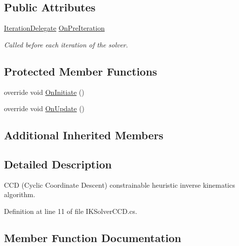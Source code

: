 \subsection*{Public Attributes}
\begin{DoxyCompactItemize}
\item 
\mbox{\hyperlink{class_root_motion_1_1_final_i_k_1_1_i_k_solver_ae3da6a8ccd8224ce56d15c4da5cd1ef7}{Iteration\+Delegate}} \mbox{\hyperlink{class_root_motion_1_1_final_i_k_1_1_i_k_solver_c_c_d_a8dd20d15fc2179df1e1cfb3d476804df}{On\+Pre\+Iteration}}
\begin{DoxyCompactList}\small\item\em Called before each iteration of the solver. \end{DoxyCompactList}\end{DoxyCompactItemize}
\subsection*{Protected Member Functions}
\begin{DoxyCompactItemize}
\item 
override void \mbox{\hyperlink{class_root_motion_1_1_final_i_k_1_1_i_k_solver_c_c_d_ac5297e593852814356258fe9f51a2774}{On\+Initiate}} ()
\item 
override void \mbox{\hyperlink{class_root_motion_1_1_final_i_k_1_1_i_k_solver_c_c_d_a1f3584003199b9f26fdbe7f6ac912c11}{On\+Update}} ()
\end{DoxyCompactItemize}
\subsection*{Additional Inherited Members}


\subsection{Detailed Description}
C\+CD (Cyclic Coordinate Descent) constrainable heuristic inverse kinematics algorithm. 



Definition at line 11 of file I\+K\+Solver\+C\+C\+D.\+cs.



\subsection{Member Function Documentation}
\mbox{\label{class_root_motion_1_1_final_i_k_1_1_i_k_solver_c_c_d_a99b22c85ea89d228dc3a85b0dab23d06}} 

